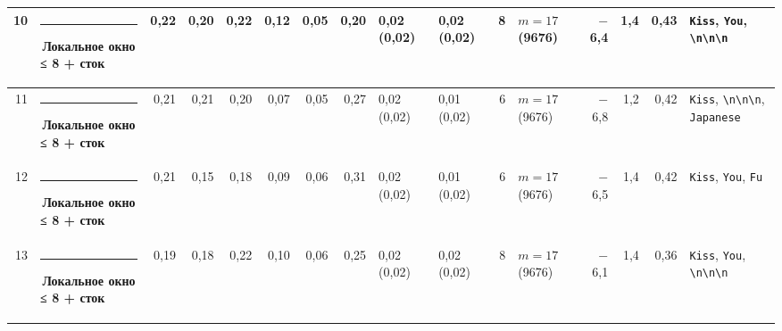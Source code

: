 \documentclass[10pt]{article}
\begin{document}
\begin{minipage}{\linewidth}
\begin{center}
{\begin{tabular}{|r|l|r|r|r|r|r|r|l|l|r|l|r|r|r|l|}
10 & \textcolor[HTML]{1BAF7A}{\rule{0.62em}{0.62em}}\,\textbf{Локальное окно ≤ 8 + сток} & 0,22 & 0,20 & 0,22 & 0,12 & 0,05 & 0,20 & 0,02 (0,02) & 0,02 (0,02) & 8 & $m{=}17$ (9676) & $-$6,4 & 1,4 & 0,43 & \texttt{\textvisiblespace{}Kiss}, \texttt{\textvisiblespace{}You}, \texttt{\textvisiblespace{}\textbackslash{}n\textbackslash{}n\textbackslash{}n} \\ \hline
11 & \textcolor[HTML]{1BAF7A}{\rule{0.62em}{0.62em}}\,\textbf{Локальное окно ≤ 8 + сток} & 0,21 & 0,21 & 0,20 & 0,07 & 0,05 & 0,27 & 0,02 (0,02) & 0,01 (0,02) & 6 & $m{=}17$ (9676) & $-$6,8 & 1,2 & 0,42 & \texttt{\textvisiblespace{}Kiss}, \texttt{\textvisiblespace{}\textbackslash{}n\textbackslash{}n\textbackslash{}n}, \texttt{\textvisiblespace{}Japanese} \\ \hline
12 & \textcolor[HTML]{1BAF7A}{\rule{0.62em}{0.62em}}\,\textbf{Локальное окно ≤ 8 + сток} & 0,21 & 0,15 & 0,18 & 0,09 & 0,06 & 0,31 & 0,02 (0,02) & 0,01 (0,02) & 6 & $m{=}17$ (9676) & $-$6,5 & 1,4 & 0,42 & \texttt{\textvisiblespace{}Kiss}, \texttt{\textvisiblespace{}You}, \texttt{\textvisiblespace{}Fu} \\ \hline
13 & \textcolor[HTML]{1BAF7A}{\rule{0.62em}{0.62em}}\,\textbf{Локальное окно ≤ 8 + сток} & 0,19 & 0,18 & 0,22 & 0,10 & 0,06 & 0,25 & 0,02 (0,02) & 0,02 (0,02) & 8 & $m{=}17$ (9676) & $-$6,1 & 1,4 & 0,36 & \texttt{\textvisiblespace{}Kiss}, \texttt{\textvisiblespace{}You}, \texttt{\textvisiblespace{}\textbackslash{}n\textbackslash{}n\textbackslash{}n} \\ \hline
\hline\end{tabular}}\end{center}
\end{minipage}
\par\vspace{0.4em}
\end{document}

